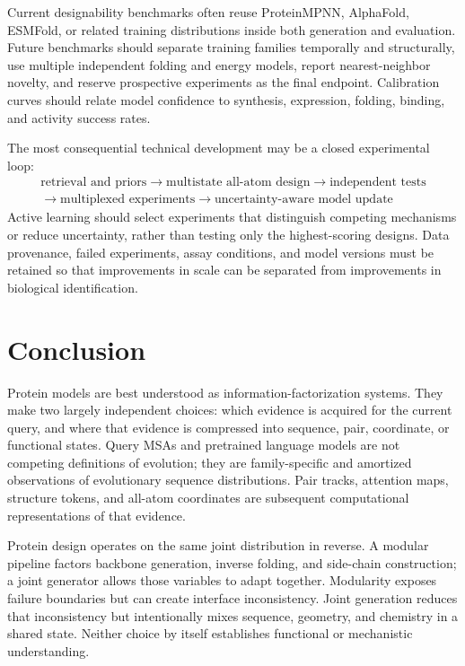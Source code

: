 \documentclass[10pt]{article}
\begin{document}
Current designability benchmarks often reuse ProteinMPNN, AlphaFold, ESMFold, or related training
distributions inside both generation and evaluation.  Future benchmarks should separate training
families temporally and structurally, use multiple independent folding and energy models, report
nearest-neighbor novelty, and reserve prospective experiments as the final endpoint.  Calibration
curves should relate model confidence to synthesis, expression, folding, binding, and activity
success rates.

The most consequential technical development may be a closed experimental loop:
\begin{equation}
\boxed{
\begin{gathered}
\text{retrieval and priors}
\rightarrow
\text{multistate all-atom design}
\rightarrow
\text{independent tests}\\
\longrightarrow
\text{multiplexed experiments}
\rightarrow
\text{uncertainty-aware model update}
\end{gathered}}
\label{eq:future-design-loop}
\end{equation}
Active learning should select experiments that distinguish competing mechanisms or reduce
uncertainty, rather than testing only the highest-scoring designs.  Data provenance, failed
experiments, assay conditions, and model versions must be retained so that improvements in scale
can be separated from improvements in biological identification.

\section{Conclusion}

Protein models are best understood as information-factorization systems.  They make two largely
independent choices: which evidence is acquired for the current query, and where that evidence is
compressed into sequence, pair, coordinate, or functional states.  Query MSAs and pretrained
language models are not competing definitions of evolution; they are family-specific and amortized
observations of evolutionary sequence distributions.  Pair tracks, attention maps, structure tokens,
and all-atom coordinates are subsequent computational representations of that evidence.

Protein design operates on the same joint distribution in reverse.  A modular pipeline factors
backbone generation, inverse folding, and side-chain construction; a joint generator allows those
variables to adapt together.  Modularity exposes failure boundaries but can create interface
inconsistency.  Joint generation reduces that inconsistency but intentionally mixes sequence,
geometry, and chemistry in a shared state.  Neither choice by itself establishes functional or
mechanistic understanding.
\end{document}
